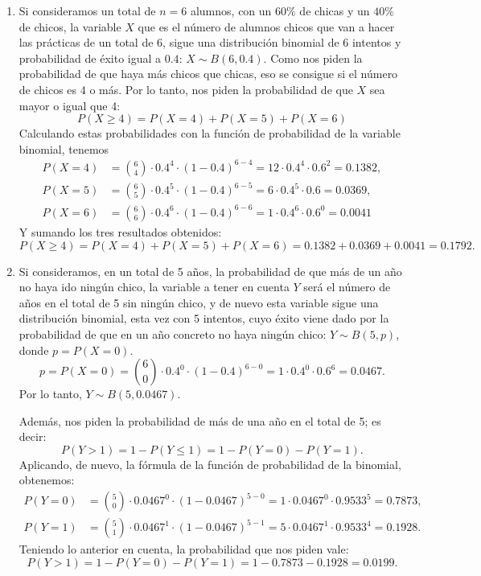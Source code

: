 {\begin{enumerate}
\item Si consideramos un total de $n=6$ alumnos, con un $60\%$ de chicas y un $40\%$ de chicos, la variable $X$ que es el número de alumnos chicos que van a hacer las prácticas de un total de 6, sigue una distribución binomial de 6 intentos y probabilidad de éxito igual a $0.4$: $X\sim B(6,0.4)$. Como nos piden la probabilidad de que haya más chicos que chicas, eso se consigue si el número de chicos es 4 o más. Por lo tanto, nos piden la probabilidad de que $X$ sea mayor o igual que 4:
\[
P(X \ge 4) = P(X = 4) + P(X = 5) + P(X = 6)
\]
Calculando estas probabilidades con la función de probabilidad de la variable binomial, tenemos
\begin{align*}
P(X = 4) &= \binom{6}{4}\cdot 0.4^4  \cdot (1-0.4)^{6-4}  = 12\cdot 0.4^4\cdot 0.6^2 = 0.1382,\\
P(X = 5) &= \binom{6}{5}\cdot 0.4^5  \cdot (1-0.4)^{6-5}  = 6\cdot 0.4^5 \cdot 0.6 = 0.0369,\\
P(X = 6) &= \binom{6}{6}\cdot 0.4^6  \cdot (1-0.4)^{6-6}  = 1\cdot 0.4^6 \cdot 0.6^0 = 0.0041
\end{align*}
Y sumando los tres resultados obtenidos:
\[
P(X \ge 4) = P(X = 4) + P(X = 5) + P(X = 6)= 0.1382+0.0369+0.0041=0.1792.
\]

\item Si consideramos, en un total de 5 años, la probabilidad de que más de un año no haya ido ningún chico, la variable a tener en cuenta $Y$ será el número de años en el total de 5 sin ningún chico, y de nuevo esta variable sigue una distribución binomial, esta vez con 5 intentos, cuyo éxito viene dado por la probabilidad de que en un año concreto no haya ningún chico: $Y \sim B(5,p)$, donde $p=P(X=0)$.
\[
p = P(X = 0) = \binom{6}{0}\cdot 0.4^0  \cdot (1-0.4)^{6-0}  = 1\cdot 0.4^0\cdot 0.6^6 = 0.0467.
\]
Por lo tanto, $Y \sim B(5,0.0467)$.

Además, nos piden la probabilidad de más de una año en el total de 5; es decir: 
\[
P(Y>1)=1-P(Y\leq 1) = 1-P(Y=0)-P(Y=1).
\]
Aplicando, de nuevo, la fórmula de la función de probabilidad de la binomial, obtenemos:
\begin{align*}
P(Y = 0) &= \binom{5}{0}\cdot 0.0467^0  \cdot (1 - 0.0467)^{5-0} = 1\cdot 0.0467^0\cdot 0.9533^5  = 0.7873,\\
P(Y = 1) &= \binom{5}{1}\cdot 0.0467^1  \cdot (1 - 0.0467)^{5-1} = 5\cdot 0.0467^1\cdot 0.9533^4  = 0.1928.
\end{align*}
Teniendo lo anterior en cuenta, la probabilidad que nos piden vale:
\[
P(Y>1)=1-P(Y=0)-P(Y=1)=1-0.7873-0.1928=0.0199.
\]
\end{enumerate}
}


